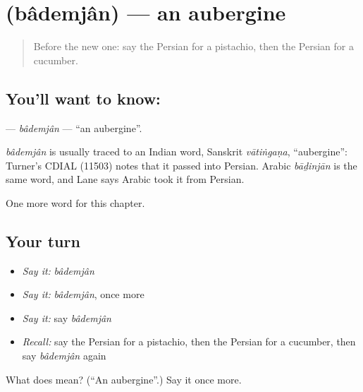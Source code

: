 \section[\texorpdfstring{\fa{بادمجان} (bâdemjân)}{بادمجان (bâdemjân)}]{ (bâdemjân) — an aubergine}

\label{lesson:FA-C101-bademjan}



\begin{quote}
Before the new one: say the Persian for a pistachio, then the Persian for a cucumber.
\end{quote}

\subsection*{You'll want to know: }
\textbf{} — \emph{bâdemjân} — \textquotedblleft{}an aubergine\textquotedblright{}.

\begin{cousinweb}
\emph{bâdemjân} is usually traced to an Indian word, Sanskrit \emph{vātiṅgaṇa}, \textquotedblleft{}aubergine\textquotedblright{}: Turner's CDIAL (11503) notes that it passed into Persian. Arabic \emph{bāḏinjān} is the same word, and Lane says Arabic took it from Persian.
\end{cousinweb}

\begin{grammarlens}[title={What you've built}]
One more word for this chapter.
\end{grammarlens}

\subsection*{Your turn}
\begin{itemize}
\raggedright
  \item \emph{Say it:} \emph{bâdemjân}
  \item \emph{Say it:} \emph{bâdemjân}, once more
  \item \emph{Say it:} say \emph{bâdemjân}
  \item \emph{Recall:} say the Persian for a pistachio, then the Persian for a cucumber, then say \emph{bâdemjân} again
\end{itemize}

\begin{tcolorbox}[breakable,colback=teal!4,colframe=teal!35!black,title={Before you move on}]
What does  mean? (\textquotedblleft{}An aubergine\textquotedblright{}.) Say it once more.
\end{tcolorbox}
